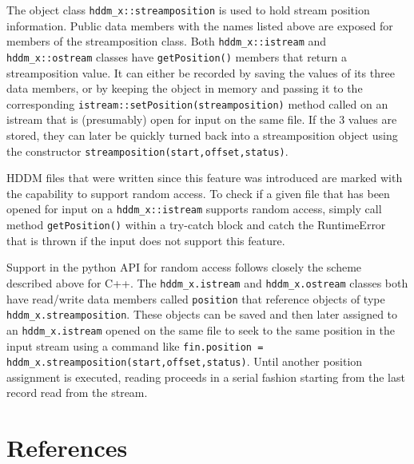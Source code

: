 \documentclass{revtex4}
\begin{document}
The object class \texttt{hddm\_x::streamposition} is used to hold stream
position information. Public data members with the names listed above are
exposed for members of the streamposition class. Both \texttt{hddm\_x::istream}
and \texttt{hddm\_x::ostream} classes have \texttt{getPosition()} members that
return a streamposition value. It can either be recorded by saving the values
of its three data members, or by keeping the object in memory and passing it
to the corresponding \texttt{istream::setPosition(streamposition)} method
called on an istream that is (presumably) open for input on the same file.
If the 3 values are stored, they can later be quickly turned back into a
streamposition object using the constructor 
\texttt{streamposition(start,offset,status)}.

HDDM files that were written since this feature was introduced are marked
with the capability to support random access. To check if a given file that
has been opened for input on a \texttt{hddm\_x::istream} supports random access,
simply call method \texttt{getPosition()} within a try-{}catch block and catch
the RuntimeError that is thrown if the input does not support this feature.

Support in the python API for random access follows closely the scheme
described above for C++. The \texttt{hddm\_x.istream} and 
\texttt{hddm\_x.ostream} classes both have read/write data members called
\texttt{position} that reference objects of type \texttt{hddm\_x.streamposition}.
These objects can be saved and then later assigned to an
\texttt{hddm\_x.istream} opened on the same file to seek to the same position
in the input stream using a command like
\texttt{fin.position = hddm\_x.streamposition(start,offset,status)}. Until
another position assignment is executed, reading proceeds in a serial
fashion starting from the last record read from the stream.

\section{References}
\end{document}
